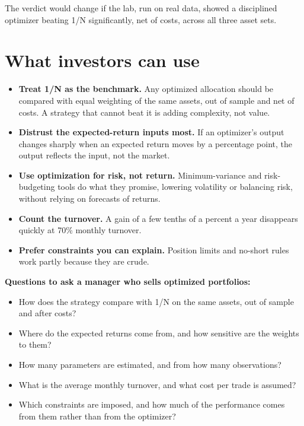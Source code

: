 The verdict would change if the lab, run on real data, showed a disciplined optimizer beating 1/N significantly, net of costs, across all three asset sets.

\section{What investors can use}
\label{sec:19-investors}

\begin{itemize}
  \item \textbf{Treat 1/N as the benchmark.} Any optimized allocation should be compared with equal weighting of the same assets, out of sample and net of costs. A strategy that cannot beat it is adding complexity, not value.
  \item \textbf{Distrust the expected-return inputs most.} If an optimizer's output changes sharply when an expected return moves by a percentage point, the output reflects the input, not the market.
  \item \textbf{Use optimization for risk, not return.} Minimum-variance and risk-budgeting tools do what they promise, lowering volatility or balancing risk, without relying on forecasts of returns.
  \item \textbf{Count the turnover.} A gain of a few tenths of a percent a year disappears quickly at 70\% monthly turnover.
  \item \textbf{Prefer constraints you can explain.} Position limits and no-short rules work partly because they are crude.
\end{itemize}

\textbf{Questions to ask a manager who sells optimized portfolios:}

\begin{itemize}
  \item How does the strategy compare with 1/N on the same assets, out of sample and after costs?
  \item Where do the expected returns come from, and how sensitive are the weights to them?
  \item How many parameters are estimated, and from how many observations?
  \item What is the average monthly turnover, and what cost per trade is assumed?
  \item Which constraints are imposed, and how much of the performance comes from them rather than from the optimizer?
\end{itemize}

